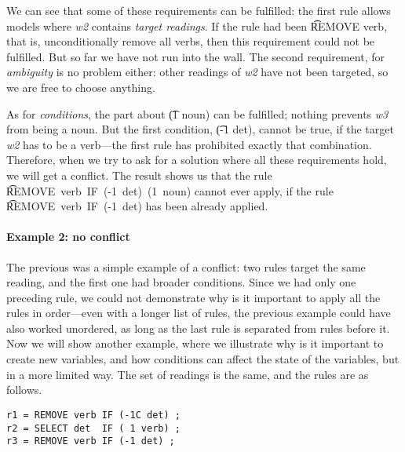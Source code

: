 We can see that some of these requirements can be fulfilled: the first rule allows models where {\em w2} contains \emph{target readings}. If the rule had been \t{REMOVE verb}, that is, unconditionally remove all verbs, then this requirement could not be fulfilled. But so far we have not run into the wall. 
The second requirement, for \emph{ambiguity} is no problem either: other readings of {\em w2} have not been targeted, so we are free to choose anything.

As for \emph{conditions}, the part about \t{(1 noun)} can be fulfilled; nothing prevents {\em w3} from being a noun. But the first condition, \t{(-1 det)}, cannot be true, if the target {\em w2} has to be a verb---the first rule has prohibited exactly that combination.
Therefore, when we try to ask for a solution where all these requirements hold, we will get a conflict. The result shows us that the rule \t{REMOVE~verb~IF~(-1~det)~(1~noun)} cannot ever apply, if the rule \t{REMOVE~verb~IF~(-1~det)} has been already applied. 

\paragraph{Example 2: no conflict}
The previous was a simple example of a conflict: two rules target the same reading, and the first one had broader conditions. 
Since we had only one preceding rule, we could not demonstrate why is it important to apply all the rules in order---even with a longer list of rules, the previous example could have also worked unordered, as long as the last rule is separated from rules before it.
Now we will show another example, where we illustrate why is it important to create new variables, and how conditions can affect the state of the variables, but in a more limited way. The set of readings is the same, and the rules are as follows.

\begin{verbatim}
r1 = REMOVE verb IF (-1C det) ;
r2 = SELECT det  IF ( 1 verb) ;
r3 = REMOVE verb IF (-1 det) ;
\end{verbatim}

